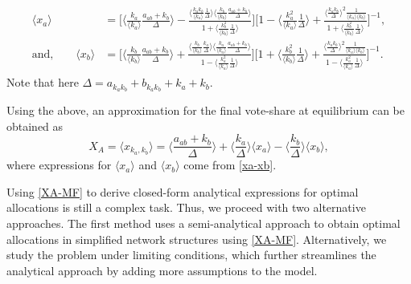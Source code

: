 \begin{align}
    \begin{split}
       \langle x_{a} \rangle &= \Bigg[\langle \frac{k_{a}}{\langle k_{a} \rangle} \frac{a_{ab}+k_{b}}{\Delta} \rangle - \frac{\langle \frac{k_{a}k_{b}}{\langle k_{a} \rangle} \frac{1}{\Delta}\rangle \langle \frac{k_{b}}{\langle k_{b} \rangle} \frac{a_{ab}+k_{b}}{\Delta} \rangle }{1 + \langle \frac{k_{b}^2}{\langle k_{b} \rangle} \frac{1}{\Delta} \rangle}\Bigg]
    \Bigg[1 - \langle \frac{k_{a}^2}{\langle k_{a} \rangle} \frac{1}{\Delta} \rangle + \frac{\langle \frac{k_{a}k_{b}}{\Delta} \rangle^2 \frac{1}{\langle k_{a} \rangle \langle k_{b} \rangle}}{1 + \langle \frac{k_{b}^2}{\langle k_{b}\rangle} \frac{1}{\Delta} \rangle}\Bigg]^{-1}, \\  
    \text{and,} \qquad \langle x_{b} \rangle  &= \Bigg[\langle \frac{k_{b}}{\langle k_{b}\rangle} \frac{a_{ab}+k_{b}}{\Delta} \rangle + \frac{\langle \frac{k_{b}}{\langle k_{b} \rangle} \frac{k_{a}}{\Delta}\rangle \langle \frac{k_{a}}{\langle k_{a} \rangle} \frac{a_{ab}+k_{b}}{\Delta} \rangle}{1 - \langle \frac{k_{a}^2}{\langle k_{a} \rangle} \frac{1}{\Delta} \rangle}\Bigg]
    \Bigg[1 + \langle \frac{k_{b}^2}{\langle k_{b} \rangle} \frac{1}{\Delta} \rangle + \frac{\langle \frac{k_{a}k_{b}}{\Delta} \rangle^2 \frac{1}{\langle k_{a} \rangle \langle k_{b} \rangle}}{1 - \langle \frac{k_{a}^2}{\langle k_{a} \rangle} \frac{1}{\Delta} \rangle}
    \Bigg]^{-1}.
    \end{split}
    \label{xa-xb}
\end{align}
Note that here $\Delta = a_{k_{a}k_{b}} + b_ {k_{a}k_{b}} + k_{a} + k_{b}$. 

Using the above, an approximation for the final vote-share at equilibrium can be obtained as
\begin{equation}
    X_{A} = \langle x_{k_{a},k_{b}} \rangle = \langle \frac{a_{ab}+k_{b}}{\Delta} \rangle + \langle \frac{k_{a}}{\Delta} \rangle \langle x_{a} \rangle - \langle \frac{k_{b}}{\Delta} \rangle \langle x_{b} \rangle,
    \label{XA-MF}
\end{equation}
where expressions for $\langle x_{a} \rangle$ and $\langle x_{b} \rangle$ come from \cref{xa-xb}. 

Using \cref{XA-MF} to derive closed-form analytical expressions for optimal allocations is still a complex task. Thus, we proceed with two alternative approaches. The first method uses a semi-analytical approach to obtain optimal allocations in simplified network structures using \cref{XA-MF}. 
Alternatively, we study the problem under limiting conditions, which further streamlines the analytical approach by adding more assumptions to the model. 

